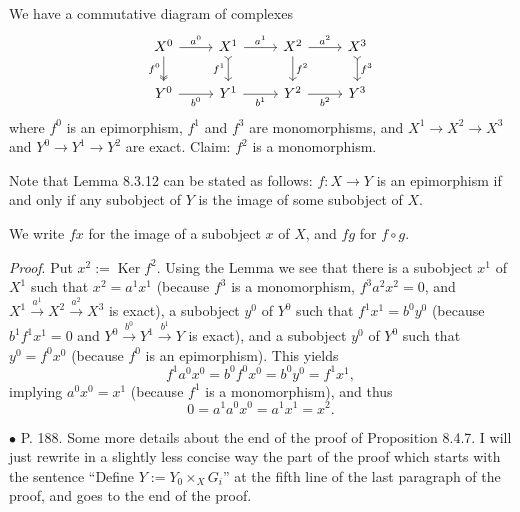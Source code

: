 \documentclass[12pt]{article}
\theoremstyle{remark}
\newcommand{\bu}{\bullet}
\newcommand{\n}{\noindent}
\DeclareMathOperator{\Ker}{Ker}
\begin{document}
We have a commutative diagram of complexes 
$$
\begin{tikzcd}
X^0\arrow[two heads]{d}[swap]{f^0}\arrow{r}{a^0}&
X^1\arrow[tail]{d}[swap]{f^1}\arrow{r}{a^1}&
X^2\arrow{d}{f^2}\arrow{r}{a^2}&
X^3\arrow[tail]{d}{f^3}\\ 
Y^0\arrow{r}[swap]{b^0}&
Y^1\arrow{r}[swap]{b^1}&
Y^2\arrow{r}[swap]{b^2}&
Y^3
\end{tikzcd}
$$
where $f^0$ is an epimorphism, $f^1$ and $f^3$ are monomorphisms, and $X^1\to X^2\to X^3$ and $Y^0\to Y^1\to Y^2$ are exact. Claim: $f^2$ is a monomorphism. 

Note that Lemma 8.3.12 can be stated as follows: $f:X\to Y$ is an epimorphism if and only if any subobject of $Y$ is the image of some subobject of $X$. 

We write $fx$ for the image of a subobject $x$ of $X$, and $fg$ for $f\circ g$.

\n\emph{Proof}. Put $x^2:=\Ker f^2$. Using the Lemma we see that there is a subobject $x^1$ of $X^1$ such that $x^2=a^1x^1$ (because $f^3$ is a monomorphism, $f^3a^2x^2=0$, and $X^1\overset{a^1}{\to}X^2\overset{a^2}{\to}X^3$ is exact), a subobject $y^0$ of $Y^0$ such that $f^1x^1=b^0y^0$ (because $b^1f^1x^1=0$ and $Y^0\overset{b^0}{\to}Y^1\overset{b^1}{\to}Y$ is exact), and a subobject $y^0$ of $Y^0$ such that $y^0=f^0x^0$ (because $f^0$ is an epimorphism). This yields  
$$
f^1a^0x^0=b^0f^0x^0=b^0y^0=f^1x^1,
$$
implying $a^0x^0=x^1$ (because $f^1$ is a monomorphism), and thus 
$$
0=a^1a^0x^0=a^1x^1=x^2.
$$

% 

\n$\bu$ P. 188. Some more details about the end of the proof of Proposition 8.4.7. I will just rewrite in a slightly less concise way the part of the proof which starts with the sentence ``Define $Y:=Y_0\times_XG_i$'' at the fifth line of the last paragraph of the proof, and goes to the end of the proof. 
\end{document}
